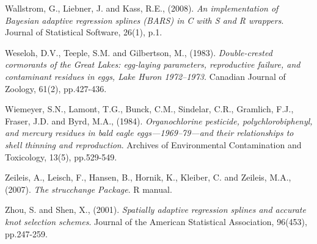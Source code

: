 \documentclass[submit]{smj}
\begin{document}
\begin{thebibliography}{99}
Wallstrom, G., Liebner, J. and Kass, R.E., (2008). 
\textit{An implementation of Bayesian adaptive regression splines (BARS) in C with S and R wrappers}. 
Journal of Statistical Software, 26(1), p.1.

Weseloh, D.V., Teeple, S.M. and Gilbertson, M., (1983). 
\textit{Double-crested cormorants of the Great Lakes: egg-laying parameters, reproductive failure, and contaminant residues in eggs, Lake Huron 1972–1973.} Canadian Journal of Zoology, 61(2), pp.427-436.

Wiemeyer, S.N., Lamont, T.G., Bunck, C.M., Sindelar, C.R., Gramlich, F.J., Fraser, J.D. and Byrd, M.A., (1984). 
\textit{Organochlorine pesticide, polychlorobiphenyl, and mercury residues in bald eagle eggs—1969–79—and their relationships to shell thinning and reproduction}.
Archives of Environmental Contamination and Toxicology, 13(5), pp.529-549.

Zeileis, A., Leisch, F., Hansen, B., Hornik, K., Kleiber, C. and Zeileis, M.A., (2007). 
\textit{The strucchange Package}.
R manual.

Zhou, S. and Shen, X., (2001). 
\textit{Spatially adaptive regression splines and accurate knot selection schemes}.
Journal of the American Statistical Association, 96(453), pp.247-259.

\end{thebibliography}
\end{document}
